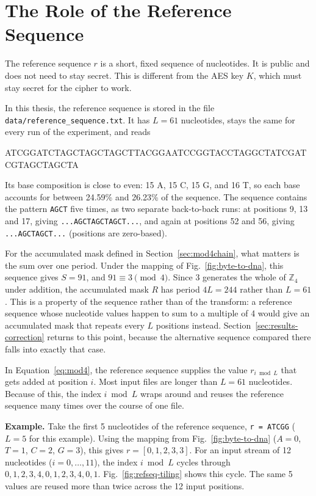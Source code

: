 \documentclass[12pt,a4paper,twoside]{report}
\numberwithin{equation}{chapter}
\begin{document}
\section{The Role of the Reference Sequence}
\label{sec:refseq}
The reference sequence $r$ is a short, fixed sequence of nucleotides.
It is public and does not need to stay secret. This is different from
the AES key $K$, which must stay secret for the cipher to work.

In this thesis, the reference sequence is stored in the file
\texttt{data/reference\_sequence.txt}. It has $L=61$ nucleotides, stays
the same for every run of the experiment, and reads

\begin{center}
{\ttfamily\small ATCGGATCTAGCTAGCTAGCTTACGGAATCCGGTACCTAGGCTATCGATCGTAGCTAGCTA}
\end{center}

Its base composition is close to even: 15 A, 15 C, 15 G, and 16 T, so
each base accounts for between 24.59\% and 26.23\% of the sequence. The
sequence contains the pattern \texttt{AGCT} five times, as two separate
back-to-back runs: at positions 9, 13 and 17, giving
\texttt{...AGCTAGCTAGCT...}, and again at positions 52 and 56, giving
\texttt{...AGCTAGCT...} (positions are zero-based).

For the accumulated mask defined in Section~\ref{sec:mod4chain}, what
matters is the sum over one period. Under the mapping of
Fig.~\ref{fig:byte-to-dna}, this sequence gives $S = 91$, and
$91 \equiv 3 \pmod 4$. Since 3 generates the whole of
$\mathbb{Z}_4$ under addition, the accumulated mask $R$ has period
$4L = 244$ rather than $L = 61$. This is a property of the sequence
rather than of the transform: a reference sequence whose nucleotide
values happen to sum to a multiple of 4 would give an accumulated mask
that repeats every $L$ positions instead.
Section~\ref{sec:results-correction} returns to this point, because the
alternative sequence compared there falls into exactly that case.

In Equation~\ref{eq:mod4}, the reference sequence supplies the value
$r_{i \bmod L}$ that gets added at position $i$. Most input files are
longer than $L=61$ nucleotides. Because of this, the index
$i \bmod L$ wraps around and reuses the reference sequence many times
over the course of one file.

\textbf{Example.} Take the first 5 nucleotides of the reference
sequence, \texttt{r = ATCGG} ($L=5$ for this example). Using the
mapping from Fig.~\ref{fig:byte-to-dna} ($A=0$, $T=1$, $C=2$, $G=3$),
this gives $r = [0, 1, 2, 3, 3]$. For an input stream of 12 nucleotides
($i = 0, \ldots, 11$), the index $i \bmod L$ cycles through
$0,1,2,3,4,0,1,2,3,4,0,1$. Fig.~\ref{fig:refseq-tiling} shows this
cycle. The same 5 values are reused more than twice across the 12 input
positions.
\end{document}
